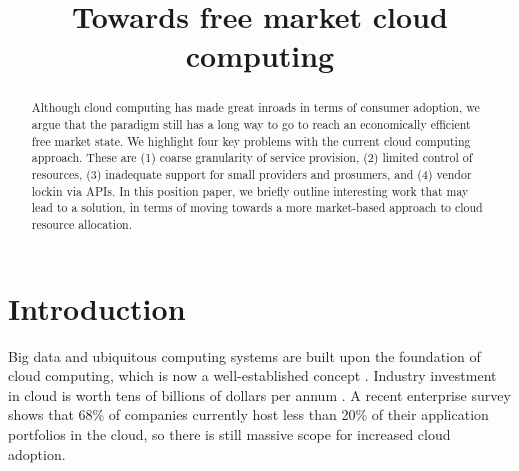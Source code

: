\documentclass[conference,10pt]{IEEEtran}
\begin{document}
\title{Towards free market cloud computing}


\author{
}

\maketitle


\begin{abstract}
Although cloud computing has made great inroads in terms of consumer adoption, we argue that the paradigm still has a long way to go to reach an economically efficient free market state.
We highlight four key problems with the current cloud computing approach. These are (1) coarse granularity of service provision, (2) limited control of resources, (3) inadequate support for small providers and prosumers, and (4) vendor lockin via APIs.
In this position paper, we briefly outline interesting work that may lead to a solution, in terms of moving towards a more market-based approach to cloud resource allocation.
\end{abstract}


\section{Introduction}
\label{sec-intro}

Big data and ubiquitous computing systems are built upon the foundation of cloud computing, which is now a well-established concept \cite{armbrust2010view}. Industry investment in cloud is worth tens of billions of dollars per annum 
\cite{url1,url2}.
A recent enterprise survey \cite{rightscale} shows that 68\% of companies currently host less than 20\% of their application portfolios in the cloud, so there is still massive scope for increased cloud adoption.
\end{document}
